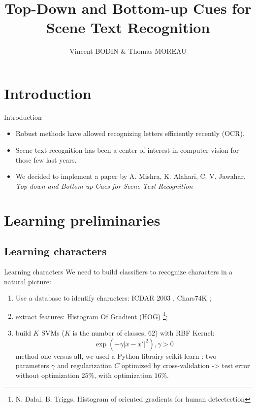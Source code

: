\documentclass[handout]{beamer}
\title{\textbf{Top-Down and Bottom-up Cues for Scene Text Recognition}}
\author{Vincent BODIN \& Thomas MOREAU}
\begin{document}
\renewcommand{\contentsname}{Sommaire}


\begin{frame}[allowframebreaks]
\titlepage
\end{frame}


\section*{Introduction}


\begin{frame}{Introduction}
\begin{itemize}
	\item Robust methods have allowed recognizing letters efficiently recently (OCR).
	\item Scene text recognition has been a center of interest in computer vision for those few last years. 
	\item We decided to implement a paper by A. Mishra, K. Alahari, C. V. Jawahar, \emph{Top-down and Bottom-up Cues for Scene Text Recognition} \cite{Mis}
\end{itemize}
\end{frame}




\section{Learning preliminaries}

\subsection{Learning characters}

\begin{frame}{Learning characters}
We need to build classifiers to recognize characters in a natural picture:
\begin{enumerate}
	\item Use a database to identify characters: ICDAR 2003 \cite{ICDARchar}, Chars74K \cite{Char74K};
	
	\item extract features: Histogram Of Gradient (HOG) \cite{Dal2005}\footnote{N. Dalal, B. Triggs, Histogram of oriented gradients for human detectection};
	
	\item build $K$ SVMs ($K$ is the number of classes, 62) with RBF Kernel:
	\begin{equation}
	\exp(-\gamma |x-x'|^2), \gamma > 0
	\label{eq:}
	\end{equation}
	method one-versus-all, we used a Python librairy scikit-learn \cite{scikit}: two parameters $\gamma$ and regularization $C$ optimized by cross-validation -> test error without optimization $25\%$, with optimization $16\%$.
\end{enumerate}
\end{frame}
\end{document}
